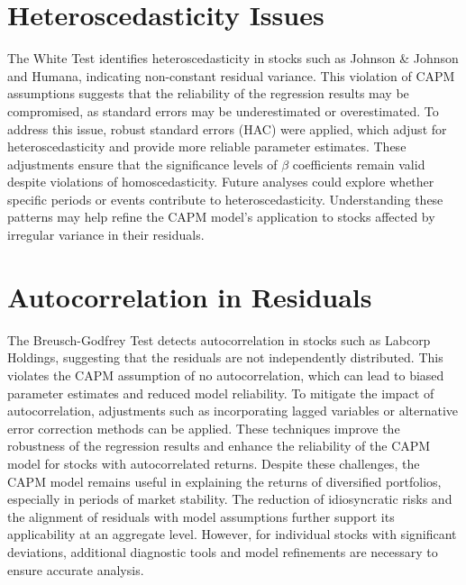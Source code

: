 \section{Heteroscedasticity Issues}
The White Test identifies heteroscedasticity in stocks such as Johnson \& Johnson and Humana, indicating non-constant residual variance. This violation of CAPM assumptions suggests that the reliability of the regression results may be compromised, as standard errors may be underestimated or overestimated.
To address this issue, robust standard errors (HAC) were applied, which adjust for heteroscedasticity and provide more reliable parameter estimates. These adjustments ensure that the significance levels of $\beta$ coefficients remain valid despite violations of homoscedasticity.
Future analyses could explore whether specific periods or events contribute to heteroscedasticity. Understanding these patterns may help refine the CAPM model's application to stocks affected by irregular variance in their residuals.

\section{Autocorrelation in Residuals}
The Breusch-Godfrey Test detects autocorrelation in stocks such as Labcorp Holdings, suggesting that the residuals are not 
independently distributed.
This violates the CAPM assumption of no autocorrelation, which can lead to biased parameter estimates and reduced model 
reliability.
To mitigate the impact of autocorrelation, adjustments such as incorporating lagged variables or alternative error correction
methods can be applied. 
These techniques improve the robustness of the regression results and enhance the reliability of the CAPM model for stocks 
with autocorrelated returns.
Despite these challenges, the CAPM model remains useful in explaining the returns of diversified portfolios,
especially in periods of market stability.
The reduction of idiosyncratic risks and the alignment of residuals with model assumptions further support its applicability 
at an aggregate level.
However, for individual stocks with significant deviations, additional diagnostic tools and model refinements are necessary to 
ensure accurate analysis.